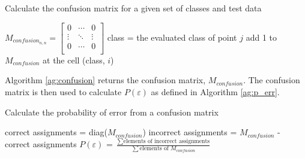 \begin{algorithm}
\caption{Calculate the confusion matrix for a given set of classes and test
data}
\label{ag:confusion}
\begin{algorithmic}
\STATE $
M_{confusion_{n,n}} =
\begin{bmatrix}
0 & \cdots & 0 \\  
\vdots & \ddots & \vdots \\
0 & \cdots & 0 \\
\end{bmatrix}
$
\STATE class = the evaluated class of point $j$
\STATE add 1 to $M_{confusion}$ at the cell (class, $i$)
\ENDFOR
\ENDFOR
\end{algorithmic}
\end{algorithm}

Algorithm \ref{ag:confusion} returns the confusion matrix, $M_{confusion}$. The confusion
matrix is then used to calculate $P(\varepsilon)$ as defined in Algorithm
\ref{ag:p_err}.

\begin{algorithm}
\caption{Calculate the probability of error from a confusion matrix}
\label{ag:p_err}
\begin{algorithmic}
\STATE correct assignments = diag($M_{confusion}$)
\STATE incorrect assignments = $M_{confusion}$ - correct assignments
\STATE $P(\varepsilon)$ = $\frac{\sum \text{elements of incorrect
assignments}}{\sum \text{elements of } M_{confusion}}$
\end{algorithmic}
\end{algorithm}
